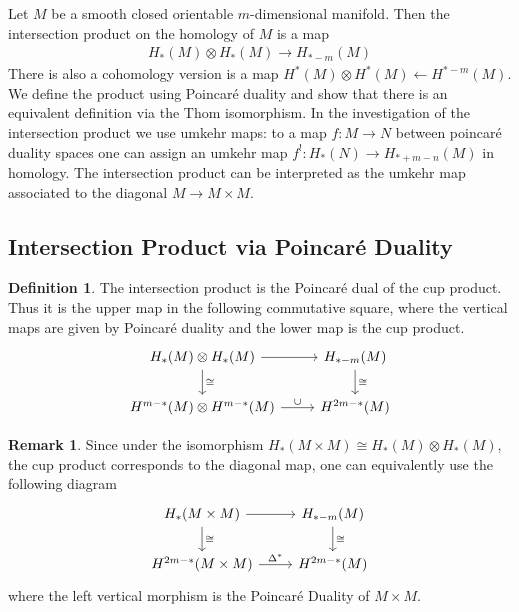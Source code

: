 \documentclass{scrartcl}
\theoremstyle{plain}
\theoremstyle{definition}
\newtheorem{definition}[theorem]{Definition}
\newtheorem{remark}[theorem]{Remark}
\newcommand{\iso}{\cong}
\newcommand{\from}{\leftarrow}
\begin{document}
Let $M$ be a smooth closed orientable $m$-dimensional manifold. Then the intersection product on the homology of $M$ is a map
\begin{align*}
    H_*(M) \otimes H_*(M) \to H_{*-m}(M)
\end{align*}
There is also a cohomology version is a map $H^*(M) \otimes H^*(M) \from H^{*-m}(M)$. We define the product using Poincaré duality and show that there is an equivalent definition via the Thom isomorphism. In the investigation of the intersection product we use umkehr maps: to a map $f\colon M\to N$ between poincaré duality spaces one can assign an umkehr map $f^!\colon H_*(N)\to H_{*+m-n}(M)$ in homology. The intersection product can be interpreted as the umkehr map associated to the diagonal $M\to M\times M$. 

\subsection{Intersection Product via Poincaré Duality} \label{subsec:intersection_product_via_pd}
\begin{definition}
The intersection product is the Poincaré dual of the cup product. Thus it is the upper map in the following commutative square, where the vertical maps are given by Poincaré duality and the lower map is the cup product.
\begin{equation}
    \begin{tikzcd}
        H_*(M) \otimes H_*(M) \dar["\iso"] \rar & H_{*-m}(M) \dar["\iso"] \\
        H^{m-*}(M)\otimes H^{m-*}(M) \rar["\cup"] &  H^{2m-*}(M)
    \end{tikzcd}
\end{equation}
\end{definition}
\begin{remark}
Since under the isomorphism $H_*(M\times M) \iso H_*(M)\otimes H_*(M)$, the cup product corresponds to the diagonal map, one can equivalently use the following diagram
\begin{equation}
    \begin{tikzcd}
        H_*(M\times M) \dar["\iso"] \rar & H_{*-m}(M) \dar["\iso"] \\
        H^{2m-*}(M\times M) \rar["\Delta^*"] & H^{2m-*}(M)
    \end{tikzcd}
\end{equation}
where the left vertical morphism is the Poincaré Duality of $M\times M$.
\end{remark}
\end{document}

